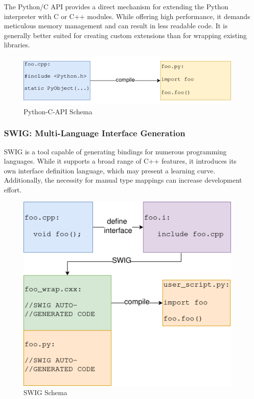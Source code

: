 The Python/C API provides a direct mechanism for extending the Python interpreter with C or C++ modules. While offering high performance, it demands meticulous memory management and can result in less readable code. It is generally better suited for creating custom extensions than for wrapping existing libraries. \cite{py-c-api}

\begin{figure}[htpb]
    \centering
    \includegraphics[width=\textwidth]{figures/python-C-API_schema.png}
    \caption{Python-C-API Schema}
    \label{fig:py-c-api-schema}
\end{figure}

\subsubsection{SWIG: Multi-Language Interface Generation}

SWIG is a tool capable of generating bindings for numerous programming languages. While it supports a broad range of C++ features, it introduces its own interface definition language, which may present a learning curve. Additionally, the necessity for manual type mappings can increase development effort. \cite{swig-docu}

\begin{figure}[htpb]
    \centering
    \includegraphics[scale=0.6]{figures/swig_schema.png}
    \caption{SWIG Schema}
    \label{fig:swig-schema}
\end{figure}


